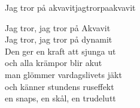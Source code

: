 \begin{song}{Jag tror på akvavit}{jagtrorpaakvavit}
\begin{vers}
Jag tror, jag tror på Akvavit\\
Jag tror, jag tror på dynamit\\
Den ger en kraft att sjunga ut\\
och alla krämpor blir akut\\
man glömmer vardagslivets jäkt\\
och känner stundens ruseffekt\\
en snaps, en skål, en trudelutt\\
\end{vers}
\end{song}
